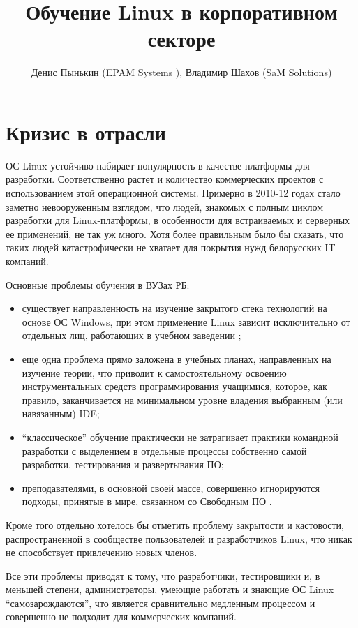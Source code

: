 \documentclass[10pt, a5paper]{article}
\begin{document}
\title{Обучение Linux в корпоративном секторе}
\author{Денис Пынькин (EPAM Systems ), Владимир Шахов (SaM Solutions)}
\maketitle
\section{Кризис в отрасли}

ОС Linux устойчиво набирает популярность в качестве платформы для разработки. Соответственно растет и количество коммерческих проектов с использованием этой операционной системы. Примерно в 2010-12 годах стало заметно невооруженным взглядом, что людей, знакомых с полным циклом разработки
для Linux-платформы, в особенности для встраиваемых и серверных ее применений, не так уж много. Хотя более правильным было бы сказать, что таких людей катастрофически не хватает для покрытия нужд белорусских IT компаний.

Основные проблемы обучения в ВУЗах РБ:

\begin{itemize}
  \item существует направленность на изучение закрытого стека технологий на основе ОС Windows, при этом применение Linux зависит исключительно от отдельных лиц, работающих в учебном заведении \cite{bib1};
  \item еще одна проблема прямо заложена в учебных планах, направленных на изучение теории, что приводит к самостоятельному освоению инструментальных средств программирования учащимися, которое, как правило, заканчивается на минимальном уровне владения выбранным (или навязанным) IDE;
  \item “классическое” обучение практически не затрагивает практики командной разработки с выделением в отдельные процессы собственно самой разработки, тестирования и развертывания ПО;
  \item преподавателями, в основной своей массе, совершенно игнорируются подходы, принятые в мире, связанном со Свободным ПО \cite{bib2}.
\end{itemize}

Кроме того отдельно хотелось бы отметить проблему закрытости и кастовости, распространенной в сообществе пользователей и разработчиков Linux, что никак не способствует привлечению новых членов.

Все эти проблемы приводят к тому, что разработчики, тестировщики и, в меньшей степени, администраторы, умеющие работать и знающие ОС Linux “самозарождаются”, что  является сравнительно медленным процессом и совершенно не подходит для коммерческих компаний.
\end{document}
